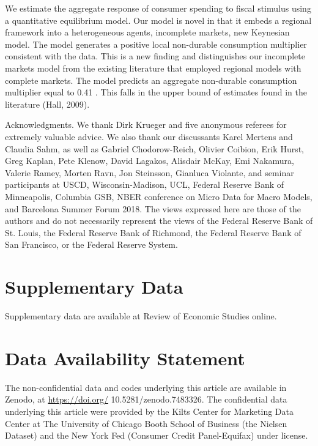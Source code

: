 \documentclass[10pt]{article}
\begin{document}
We estimate the aggregate response of consumer spending to fiscal stimulus using a quantitative equilibrium model. Our model is novel in that it embeds a regional framework into a heterogeneous agents, incomplete markets, new Keynesian model. The model generates a positive local non-durable consumption multiplier consistent with the data. This is a new finding and distinguishes our incomplete markets model from the existing literature that employed regional models with complete markets. The model predicts an aggregate non-durable consumption multiplier equal to 0.41 . This falls in the upper bound of estimates found in the literature (Hall, 2009).

Acknowledgments. We thank Dirk Krueger and five anonymous referees for extremely valuable advice. We also thank our discussants Karel Mertens and Claudia Sahm, as well as Gabriel Chodorow-Reich, Olivier Coibion, Erik Hurst, Greg Kaplan, Pete Klenow, David Lagakos, Alisdair McKay, Emi Nakamura, Valerie Ramey, Morten Ravn, Jon Steinsson, Gianluca Violante, and seminar participants at USCD, Wisconsin-Madison, UCL, Federal Reserve Bank of Minneapolis, Columbia GSB, NBER conference on Micro Data for Macro Models, and Barcelona Summer Forum 2018. The views expressed here are those of the authors and do not necessarily represent the views of the Federal Reserve Bank of St. Louis, the Federal Reserve Bank of Richmond, the Federal Reserve Bank of San Francisco, or the Federal Reserve System.

\section*{Supplementary Data}
Supplementary data are available at Review of Economic Studies online.

\section*{Data Availability Statement}
The non-confidential data and codes underlying this article are available in Zenodo, at \href{https://doi.org/}{https://doi.org/} 10.5281/zenodo.7483326. The confidential data underlying this article were provided by the Kilts Center for Marketing Data Center at The University of Chicago Booth School of Business (the Nielsen Dataset) and the New York Fed (Consumer Credit Panel-Equifax) under license.
\end{document}
